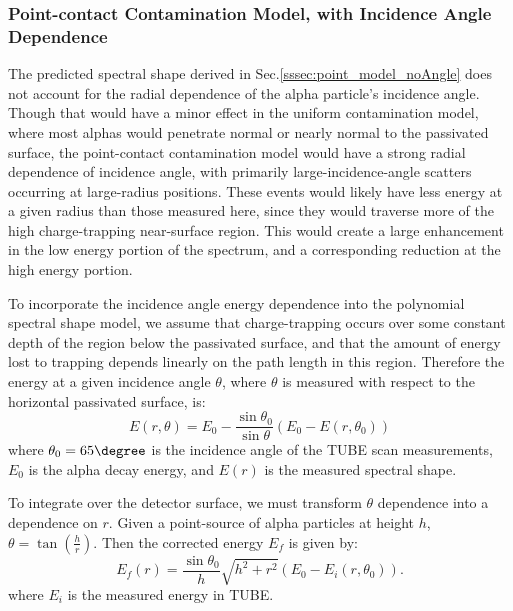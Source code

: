 \subsubsection{Point-contact Contamination Model, with Incidence Angle Dependence}
The predicted spectral shape derived in Sec.\ref{sssec:point_model_noAngle} does not account for the radial dependence of the alpha particle's incidence angle. Though that would have a minor effect in the uniform contamination model, where most alphas would penetrate normal or nearly normal to the passivated surface, the point-contact contamination model would have a strong radial dependence of incidence angle, with primarily large-incidence-angle scatters occurring at large-radius positions. These events would likely have less energy at a given radius than those measured here, since they would traverse more of the high charge-trapping near-surface region. This would create a large enhancement in the low energy portion of the spectrum, and a corresponding reduction at the high energy portion.

To incorporate the incidence angle energy dependence into the polynomial spectral shape model, we assume that charge-trapping occurs over some constant depth of the region below the passivated surface, and that the amount of energy lost to trapping depends linearly on the path length in this region. Therefore the energy at a given incidence angle $\theta$, where $\theta$ is measured with respect to the horizontal passivated surface, is:
$$ E(r, \theta) = E_0 - \frac{\sin\theta_0}{\sin\theta}(E_0-E(r, \theta_0))$$
where $\theta_0 = 65\degree$ is the incidence angle of the TUBE scan measurements, $E_0$ is the alpha decay energy, and $E(r)$ is the measured spectral shape.

To integrate over the detector surface, we must transform $\theta$ dependence into a dependence on $r$. Given a point-source of alpha particles at height $h$, $\theta = \tan(\frac{h}{r})$. Then the corrected energy $E_f$ is given by:
$$E_f(r)= \frac{\sin\theta_0}{h} \sqrt{h^2+r^2}(E_0-E_i(r, \theta_0)).$$
where $E_i$ is the measured energy in TUBE. 

